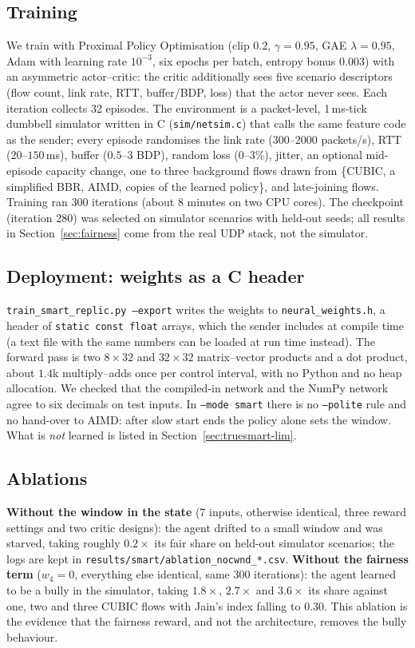 \subsection{Training}
We train with Proximal Policy Optimisation (clip $0.2$, $\gamma=0.95$, GAE $\lambda=0.95$, Adam with learning rate $10^{-3}$, six epochs per batch, entropy bonus $0.003$) with an asymmetric actor--critic: the critic additionally sees five scenario descriptors (flow count, link rate, RTT, buffer/BDP, loss) that the actor never sees. Each iteration collects 32 episodes. The environment is a packet-level, 1\,ms-tick dumbbell simulator written in C (\texttt{sim/netsim.c}) that calls the same feature code as the sender; every episode randomises the link rate ($300$--$2000$ packets/s), RTT ($20$--$150$\,ms), buffer ($0.5$--$3$ BDP), random loss ($0$--$3\%$), jitter, an optional mid-episode capacity change, one to three background flows drawn from \{CUBIC, a simplified BBR, AIMD, copies of the learned policy\}, and late-joining flows. Training ran 300 iterations (about 8 minutes on two CPU cores). The checkpoint (iteration 280) was selected on simulator scenarios with held-out seeds; all results in Section~\ref{sec:fairness} come from the real UDP stack, not the simulator.

\subsection{Deployment: weights as a C header}
\texttt{train\_smart\_replic.py --export} writes the weights to \texttt{neural\_weights.h}, a header of \texttt{static const float} arrays, which the sender includes at compile time (a text file with the same numbers can be loaded at run time instead). The forward pass is two $8\!\times\!32$ and $32\!\times\!32$ matrix--vector products and a dot product, about $1.4$k multiply--adds once per control interval, with no Python and no heap allocation. We checked that the compiled-in network and the NumPy network agree to six decimals on test inputs. In \texttt{--mode smart} there is no \texttt{--polite} rule and no hand-over to AIMD: after slow start ends the policy alone sets the window. What is \emph{not} learned is listed in Section~\ref{sec:truesmart-lim}.

\subsection{Ablations}
\label{sec:truesmart-abl}
\textbf{Without the window in the state} (7 inputs, otherwise identical, three reward settings and two critic designs): the agent drifted to a small window and was starved, taking roughly $0.2\times$ its fair share on held-out simulator scenarios; the logs are kept in \texttt{results/smart/ablation\_nocwnd\_*.csv}. \textbf{Without the fairness term} ($w_4=0$, everything else identical, same 300 iterations): the agent learned to be a bully in the simulator, taking $1.8\times$, $2.7\times$ and $3.6\times$ its share against one, two and three CUBIC flows with Jain's index falling to $0.30$. This ablation is the evidence that the fairness reward, and not the architecture, removes the bully behaviour.

